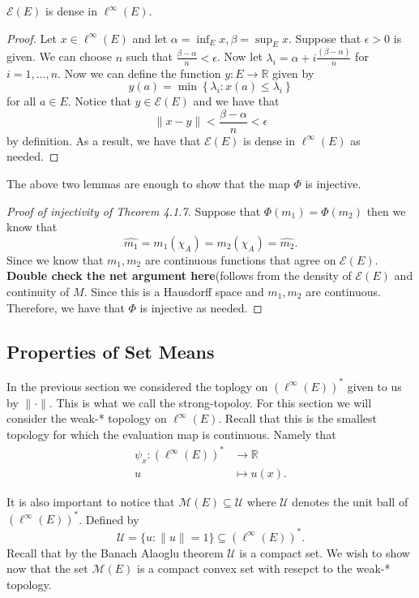 \begin{lemma}
  $\mathcal{E}(E)$ is dense in $\ell^{\infty}(E)$. 
\end{lemma}
\begin{proof}
  Let $x \in \ell^{\infty}(E)$ and let $\alpha = \inf_E x, \beta = \sup_E x$. 
  Suppose that $\epsilon > 0$ is given. We can choose $n$ such that 
  $\frac{\beta - \alpha}{n} < \epsilon$. Now let $\lambda_i = \alpha
  + i \frac{(\beta - \alpha)}{n}$ for $i = 1, \ldots,n$. Now we can define the
  function $y: E \to \mathbb{R}$ given by
  \[
  y(a) = \min \left\{ \lambda_i : x(a) \le \lambda_i \right\}
  \] 
  for all $a \in E$. Notice that $y \in \mathcal{E}(E)$ and we have that 
  \[
  \|x - y\| < \frac{\beta - \alpha}{n} < \epsilon
  \] 
  by definition. As a result, we have that $\mathcal{E}(E)$ is dense in
  $\ell^{\infty}(E)$ as needed.
\end{proof}

The above two lemmas are enough to show that the map $\Phi$ is injective.

\begin{proof}[Proof of injectivity of Theorem 4.1.7]
  Suppose that $\Phi(m_1) = \Phi(m_2)$ then we know that
  \[
  \hat{m_1} = m_1(\chi_A) = m_2(\chi_A) = \hat{m_2}
  .\] 
  Since we know that $m_1, m_2$ are continuous functions that agree on
  $\mathcal{E}(E)$. \textbf{Double check the net argument here}(follows from
  the density of $\mathcal{E}(E)$ and continuity of $M$. Since this is
  a Hausdorff space and $m_1, m_2$ are continuous. Therefore, we have that
  $\Phi$ is injective as needed.
\end{proof}

\subsection{Properties of Set Means}

In the previous section we considered the toplogy on $(\ell^{\infty}(E))^{*}$ given
to us by $\|\cdot\|$. This is what we call the strong-topoloy. For this section
we will consider the weak-* topology on $\ell^{\infty}(E)$. Recall that this is
the smallest topology for which the evaluation map is continuous. Namely that
\begin{align*}
  \psi_x : (\ell^{\infty}(E))^{*} &\to \mathbb{R} \\
                 u &\mapsto u(x)
.\end{align*}

It is also important to notice that $\mathcal{M}(E) \subseteq \mathcal{U}$
where $\mathcal{U}$ denotes the unit ball of $(\ell^{\infty}(E))^{*}$. Defined by
 \[
\mathcal{U} = \{u: \|u\| = 1\} \subseteq (\ell^{\infty}(E))^{*}
.\] 
Recall that by the Banach Alaoglu theorem $\mathcal{U}$ is a compact set. We
wish to show now that the set $\mathcal{M}(E)$ is a compact convex set with 
resepct to the weak-* topology. 

